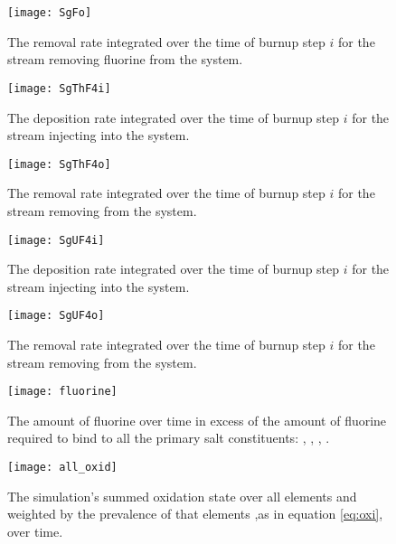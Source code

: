 \begin{figure}[H]
    \centering
    \texttt{[image: SgFo]}
    \caption{The removal rate integrated over the time of burnup step $i$
    for the stream removing fluorine from the system.}
    \label{fig:SgFo}
\end{figure}

\begin{figure}[H]
    \centering
    \texttt{[image: SgThF4i]}
    \caption{The deposition rate integrated over the time of burnup step $i$
    for the stream injecting  into the system.}
    \label{fig:SgThF4i}
\end{figure}

\begin{figure}[H]
    \centering
    \texttt{[image: SgThF4o]}
    \caption{The removal rate integrated over the time of burnup step $i$
    for the stream removing  from the system.}
    \label{fig:SgThF4o}
\end{figure}

\begin{figure}[H]
    \centering
    \texttt{[image: SgUF4i]}
    \caption{The deposition rate integrated over the time of burnup step $i$
    for the stream injecting  into the system.}
    \label{fig:SgUF4i}
\end{figure}

\begin{figure}[H]
    \centering
    \texttt{[image: SgUF4o]}
    \caption{The removal rate integrated over the time of burnup step $i$
    for the stream removing  from the system.}
    \label{fig:SgUF4o}
\end{figure}

\begin{figure}[H]
    \centering
    \texttt{[image: fluorine]}
    \caption{The amount of fluorine over time in excess of the amount of 
    fluorine required to bind to all the primary salt constituents: 
    , , , .}
    \label{fig:fluroine}
\end{figure}

\begin{figure}[H]
    \centering
    \texttt{[image: all\_oxid]}
    \caption{The simulation's summed oxidation state over all elements and
    weighted by the prevalence of that elements ,as in equation \ref{eq:oxi},
    over time.}
    \label{fig:all_oxid}
\end{figure}

